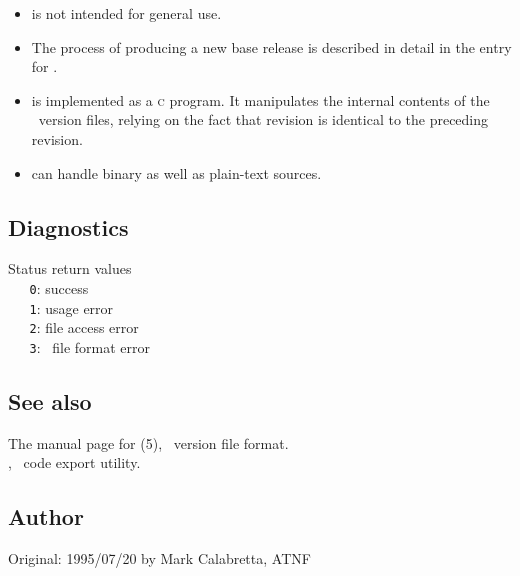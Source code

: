\begin{itemize}
\item
    is not intended for general use.

\item
   The process of producing a new base release is described in detail in the
   entry for .

\item
    is implemented as a \textsc{c} program.  It manipulates the
   internal contents of the \rcs\ version files, relying on the fact that
   revision  is identical to the preceding revision.

\item
    can handle binary as well as plain-text sources.
\end{itemize}

\subsection*{Diagnostics}
 
Status return values
\\ \verb+   0+: success
\\ \verb+   1+: usage error
\\ \verb+   2+: file access error
\\ \verb+   3+: \rcs\ file format error
 
\subsection*{See also}
 
The manual page for (5), \rcs\ version file format.\\
, \aipspp\ code export utility.

 
\subsection*{Author}
 
Original: 1995/07/20 by Mark Calabretta, ATNF


\newpage
\section{}
\label{sau}

